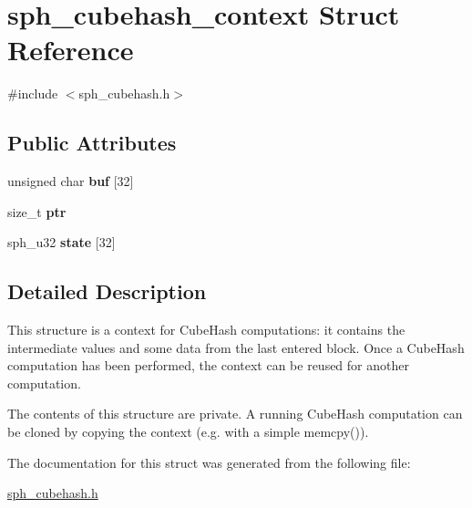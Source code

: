 \hypertarget{structsph__cubehash__context}{}\section{sph\+\_\+cubehash\+\_\+context Struct Reference}
\label{structsph__cubehash__context}


{\ttfamily \#include $<$sph\+\_\+cubehash.\+h$>$}

\subsection*{Public Attributes}
\begin{DoxyCompactItemize}
\item 
\mbox{\label{structsph__cubehash__context_a2d988768ff925b9ad52a68c84b87fc53}} 
unsigned char {\bfseries buf} \mbox{[}32\mbox{]}
\item 
\mbox{\label{structsph__cubehash__context_adbd480e1bc0f3adff4b7558c78929980}} 
size\+\_\+t {\bfseries ptr}
\item 
\mbox{\label{structsph__cubehash__context_a5355951521097d9835aae88d335674c9}} 
sph\+\_\+u32 {\bfseries state} \mbox{[}32\mbox{]}
\end{DoxyCompactItemize}


\subsection{Detailed Description}
This structure is a context for Cube\+Hash computations\+: it contains the intermediate values and some data from the last entered block. Once a Cube\+Hash computation has been performed, the context can be reused for another computation.

The contents of this structure are private. A running Cube\+Hash computation can be cloned by copying the context (e.\+g. with a simple {\ttfamily memcpy()}). 

The documentation for this struct was generated from the following file\+:\begin{DoxyCompactItemize}
\item 
\mbox{\hyperlink{sph__cubehash_8h}{sph\+\_\+cubehash.\+h}}\end{DoxyCompactItemize}
